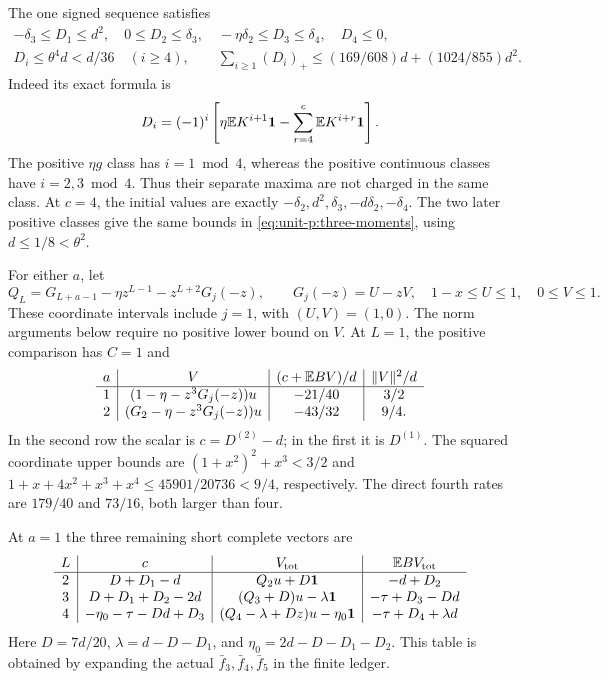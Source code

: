 The one signed sequence satisfies
\begin{equation}\label{eq:unit-p:three-moments}
\begin{gathered}
 -\delta_3\le D_1\le d^2,\quad 0\le D_2\le\delta_3,\quad
 -\eta\delta_2\le D_3\le\delta_4,\quad D_4\le0,\\
 D_i\le\theta^4d<d/36\quad(i\ge4),\qquad
 \sum_{i\ge1}(D_i)_+
       \le(169/608)d+(1024/855)d^2 .
\end{gathered}
\end{equation}
Indeed its exact formula is
\[
 D_i=(-1)^i\left[\eta\mathbb E K^{i+1}\mathbf1
                         -\sum_{r=4}^c\mathbb E K^{i+r}\mathbf1\right].
\]
The positive \(\eta g\) class has \(i=1\bmod4\), whereas
the positive continuous classes have \(i=2,3\bmod4\).
Thus their separate maxima are not charged in the same class.
At \(c=4\), the initial values are exactly
\(-\delta_2,d^2,\delta_3,-d\delta_2,-\delta_4\).
The two later positive classes give the same bounds in
\eqref{eq:unit-p:three-moments}, using \(d\le1/8<\theta^2\).

For either \(a\), let
\begin{equation}\label{eq:unit-p:data-12}
Q_L=G_{L+a-1}-\eta z^{L-1}-z^{L+2}G_j(-z),\qquad
 G_j(-z)=U-zV,\quad 1-x\le U\le1,\quad0\le V\le1.
\end{equation}
These coordinate intervals include \(j=1\), with \((U,V)=(1,0)\).
The norm arguments below require no positive lower bound on \(V\).
At \(L=1\), the positive comparison has \(C=1\) and
\[
\begin{array}{c|c|c|c}
 a&V& (c+\mathbb E BV)/d&\|V\|^2/d\\\hline
 1&(1-\eta-z^3G_j(-z))u&-21/40&3/2\\
 2&(G_2-\eta-z^3G_j(-z))u&-43/32&9/4 .
\end{array}
\]
In the second row the scalar is \(c=D^{(2)}-d\); in the first
it is \(D^{(1)}\). The squared coordinate upper bounds are
\((1+x^2)^2+x^3<3/2\) and
\(1+x+4x^2+x^3+x^4\le45901/20736<9/4\), respectively.
The direct fourth rates are \(179/40\) and \(73/16\), both
larger than four.

At \(a=1\) the three remaining short complete vectors are
\begin{equation}\label{eq:unit-p:data-13}
\begin{array}{c|c|c|c}
 L&c&V_{\rm tot}&\mathbb E BV_{\rm tot}\\\hline
 2&D+D_1-d&Q_2u+D\mathbf1&-d+D_2\\
 3&D+D_1+D_2-2d&(Q_3+D)u-\lambda\mathbf1&-\tau+D_3-Dd\\
 4&-\eta_0-\tau-Dd+D_3&
       (Q_4-\lambda+Dz)u-\eta_0\mathbf1&-\tau+D_4+\lambda d
\end{array}
\end{equation}
Here \(D=7d/20\), \(\lambda=d-D-D_1\), and
\(\eta_0=2d-D-D_1-D_2\).
This table is obtained by expanding the actual
\(\bar f_3,\bar f_4,\bar f_5\) in the finite ledger.

